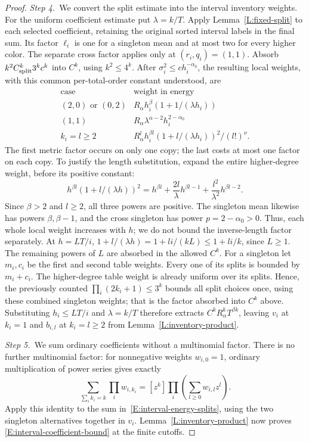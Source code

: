 \documentclass[12pt,oneside,openany]{book}
\numberwithin{equation}{section}
\theoremstyle{nogostyle}
\theoremstyle{definition}
\begin{document}
\begin{proof}
  \medskip
  \noindent\textit{Step 4.~}We convert the split estimate into the interval
  inventory weights.
  For the uniform coefficient estimate put $\lambda = k/T$. Apply
  Lemma~\ref{L:fixed-split} to each selected coefficient, retaining the original
  sorted interval labels in the final sum. Its factor $\ell_i$ is one for a
  singleton mean and at most two for every higher color. The separate cross
  factor applies only at $(r_i,q_i) = (1,1)$. Absorb $k^2C_{\rm split}^k3^kc^k$
  into $C^k$, using $k^2 \le 4^k$. After $\sigma_i^2 \le c h_i^{-\alpha_0}$, the
  resulting local weights, with this common per-total-order constant understood,
  are
  \[
    \begin{array}{c|c}
      \text{case}&\text{weight in energy}\\ \hline
      (2,0)\text{ or }(0,2)&R_\alpha h_i^\beta
      (1+1/(\lambda h_i))\\
      (1,1)&R_\alpha\lambda^{\alpha-2}h_i^{2-\alpha_0}\\
      k_i=l\ge2&R_\alpha^l h_i^{\beta l}
      (1+l/(\lambda h_i))^2/(l!)^\nu .
    \end{array}
  \]
  The first metric factor occurs on only one copy; the last costs at most one
  factor on each copy. To justify the length substitution, expand the entire
  higher-degree weight, before its positive constant:
  \[
    h^{\beta l}(1+l/(\lambda h))^2
    =h^{\beta l}+\frac{2l}{\lambda}h^{\beta l-1}
    +\frac{l^2}{\lambda^2}h^{\beta l-2}.
  \]
  Since $\beta > 2$ and $l \ge 2$, all three powers are positive. The singleton
  mean likewise has powers $\beta,\beta-1$, and the cross singleton has power $p
  = 2-\alpha_0 > 0$. Thus, each whole local weight increases with $h$; we do not
  bound the inverse-length factor separately. At $h = LT/i$, $1+l/(\lambda h) =
  1+li/(kL) \le 1+li/k$, since $L \ge 1$. The remaining powers of $L$ are
  absorbed in the allowed $C^k$. For a singleton let $m_i,c_i$ be the first and
  second table weights. Every one of its splits is bounded by $m_i+c_i$. The
  higher-degree table weight is already uniform over its splits. Hence, the
  previously counted $\prod_i(2k_i+1) \le 3^k$ bounds all split choices once,
  using these combined singleton weights; that is the factor absorbed into $C^k$
  above. Substituting $h_i \le LT/i$ and $\lambda = k/T$ therefore extracts
  $C^kR_\alpha^kT^{\beta k}$, leaving $v_i$ at $k_i = 1$ and $b_{i,l}$ at $k_i =
  l \ge 2$ from Lemma~\ref{L:inventory-product}.


  \medskip
  \noindent\textit{Step 5.~}We sum ordinary coefficients without a multinomial
  factor.
  There is no further multinomial factor: for nonnegative weights $w_{i,0} = 1$,
  ordinary multiplication of power series gives exactly
  \[
    \sum_{\sum_i k_i=k}\prod_i w_{i,k_i}
    =[z^k]\prod_i\left(\sum_{l\ge0}w_{i,l}z^l\right).
  \]
  Apply this identity to the sum in~\eqref{E:interval-energy-splits}, using the
  two singleton alternatives together in $v_i$. Lemma~\ref{L:inventory-product}
  now proves \eqref{E:interval-coefficient-bound} at the finite cutoffs.



\end{proof}
\end{document}
